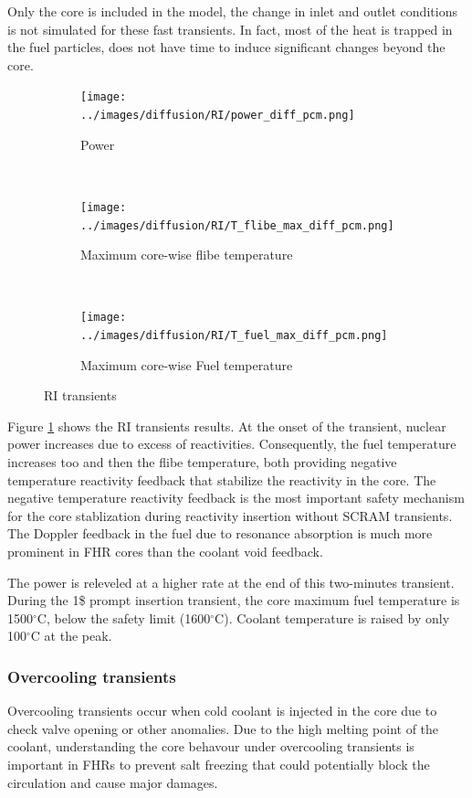 \documentclass{elsarticle}
\begin{document}
Only the core is included in the model, the change in inlet and outlet conditions is not simulated for these fast transients. In fact, most of the heat is trapped in the fuel particles, does not have time to induce significant changes beyond the core.

\begin{figure}[ht]
    \centering
    \begin{subfigure}[b]{0.45\columnwidth}
        \centering
        \texttt{[image: ../images/diffusion/RI/power\_diff\_pcm.png]}
        \caption{Power}
    \end{subfigure}%
    ~
    \begin{subfigure}[b]{0.45\columnwidth}
        \centering
        \texttt{[image: ../images/diffusion/RI/T\_flibe\_max\_diff\_pcm.png]}
        \caption{Maximum core-wise flibe temperature}
    \end{subfigure}
    ~
    \begin{subfigure}[b]{0.45\columnwidth}
        \centering
        \texttt{[image: ../images/diffusion/RI/T\_fuel\_max\_diff\_pcm.png]}
        \caption{Maximum core-wise Fuel temperature}
    \end{subfigure}
    \caption{RI transients}
    \label{fig:RI}
\end{figure}


Figure \ref{fig:RI} shows the RI transients results. At the onset of the transient, nuclear power increases due to excess of reactivities. Consequently, the fuel temperature increases too and then the flibe temperature, both providing negative temperature reactivity feedback that stabilize the reactivity in the core. 
The negative temperature reactivity feedback is the most important safety mechanism for the core stablization during reactivity insertion without SCRAM transients. The Doppler feedback in the fuel due to resonance absorption is much more prominent in FHR cores than the coolant void feedback.

The power is releveled at a higher rate at the end of this two-minutes transient. During the 1\$ prompt insertion transient, the core maximum fuel temperature is 1500$^{\circ}$C, below the safety limit (1600$^{\circ}$C). 
Coolant temperature is raised by only 100$^{\circ}$C at the peak. 






\subsubsection{Overcooling transients}
Overcooling transients occur when cold coolant is injected in the core due to check valve opening or other anomalies. Due to the high melting point of the coolant, understanding the core behavour under overcooling transients is important in FHRs to prevent salt freezing that could potentially block the circulation and cause major damages.
\end{document}
